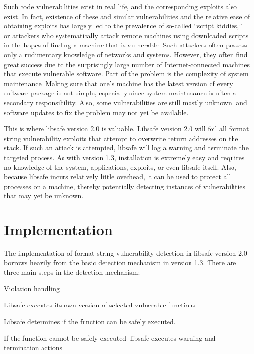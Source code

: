 \documentclass[]{article}
\begin{document}
Such code vulnerabilities exist in real life, and the
corresponding exploits also exist.  In fact, existence of these and similar
vulnerabilities and the relative ease of obtaining exploits has largely led to
the prevalence of so-called ``script kiddies,'' or attackers who systematically
attack remote machines using downloaded scripts in the hopes of finding a
machine that is vulnerable.  Such attackers often possess only a rudimentary
knowledge of networks and systems.  However, they often find great success due
to the surprisingly large number of Internet-connected machines that execute
vulnerable software.  Part of the problem is the complexity of system
maintenance.  Making sure that one's machine has the latest version of every
software package is not simple, especially since system maintenance is
often a secondary responsibility.  Also, some vulnerabilities are still mostly
unknown, and software updates to fix the problem may not yet be available.

This is where libsafe version 2.0 is valuable.  Libsafe version 2.0 will foil
all format string vulnerability exploits that attempt to overwrite return
addresses on the stack.  If such an attack is attempted, libsafe will log a
warning and terminate the targeted process.  As with version 1.3, installation
is extremely easy and requires no knowledge of the system, applications,
exploits, or even libsafe itself.  Also, because libsafe incurs relatively
little overhead, it can be used to protect all processes on a machine, thereby
potentially detecting instances of vulnerabilities that may yet be unknown.



\section{Implementation}
\label{sec:implementation}


The implementation of format string vulnerability detection in libsafe version
2.0 borrows heavily from the basic detection mechanism in version 1.3.  There
are three main steps in the detection mechanism:

\begin{Ventry}{Violation handling}
\item[Interception]
    Libsafe executes its own version of selected vulnerable functions.
\item[Safety check]
    Libsafe determines if the function can be safely executed.
\item[Violation handling]
    If the function cannot be safely executed, libsafe executes warning and
    termination actions.
\end{Ventry}
\end{document}
